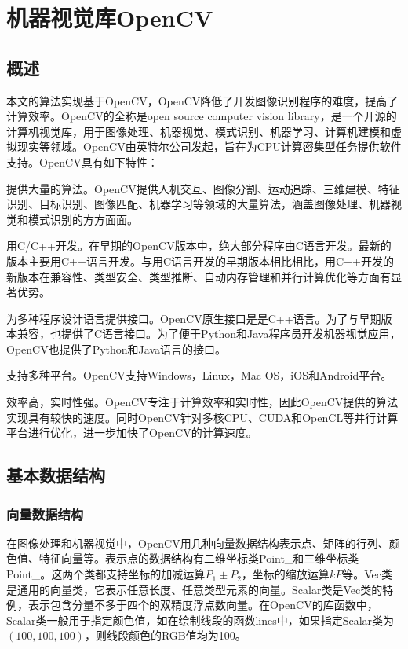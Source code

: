 
\chapter{机器视觉库OpenCV}

\section{概述}

本文的算法实现基于OpenCV，OpenCV降低了开发图像识别程序的难度，提高了计算效率。OpenCV的全称是open source computer vision library，是一个开源的计算机视觉库，用于图像处理、机器视觉、模式识别、机器学习、计算机建模和虚拟现实等领域。OpenCV由英特尔公司发起，旨在为CPU计算密集型任务提供软件支持。OpenCV具有如下特性：
\begin{asparaenum}[(1)]
\item 提供大量的算法。OpenCV提供人机交互、图像分割、运动追踪、三维建模、特征识别、目标识别、图像匹配、机器学习等领域的大量算法，涵盖图像处理、机器视觉和模式识别的方方面面。
\item 用C/C++开发。在早期的OpenCV版本中，绝大部分程序由C语言开发。最新的版本主要用C++语言开发。与用C语言开发的早期版本相比相比，用C++开发的新版本在兼容性、类型安全、类型推断、自动内存管理和并行计算优化等方面有显著优势。
\item   为多种程序设计语言提供接口。OpenCV原生接口是是C++语言。为了与早期版本兼容，也提供了C语言接口。为了便于Python和Java程序员开发机器视觉应用，OpenCV也提供了Python和Java语言的接口。
\item 支持多种平台。OpenCV支持Windows，Linux，Mac OS，iOS和Android平台。
\item 效率高，实时性强。OpenCV专注于计算效率和实时性，因此OpenCV提供的算法实现具有较快的速度。同时OpenCV针对多核CPU、CUDA和OpenCL等并行计算平台进行优化，进一步加快了OpenCV的计算速度。
\end{asparaenum}

\section{基本数据结构}

\subsection{向量数据结构}

在图像处理和机器视觉中，OpenCV用几种向量数据结构表示点、矩阵的行列、颜色值、特征向量等。表示点的数据结构有二维坐标类Point\_和三维坐标类Point\_。这两个类都支持坐标的加减运算$P_1\pm P_2$，坐标的缩放运算$kP$等。Vec类是通用的向量类，它表示任意长度、任意类型元素的向量。Scalar类是Vec类的特例，表示包含分量不多于四个的双精度浮点数向量。在OpenCV的库函数中，Scalar类一般用于指定颜色值，如在绘制线段的函数lines中，如果指定Scalar类为$(100,100,100)$，则线段颜色的RGB值均为100。

